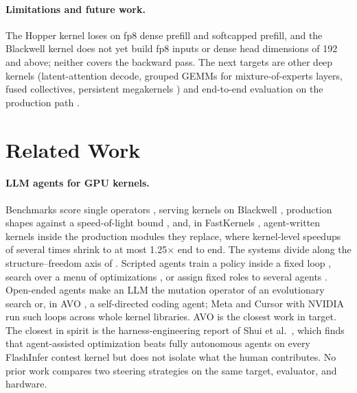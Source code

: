 \paragraph{Limitations and future work.} The Hopper kernel loses on fp8 dense prefill and
softcapped prefill, and the Blackwell kernel does not yet build fp8 inputs or dense head dimensions
of 192 and above; neither covers the backward pass. The next targets are other deep kernels (latent-attention decode, grouped GEMMs for
mixture-of-experts layers, fused collectives, persistent megakernels \cite{jin2026eventtensor}) and
end-to-end evaluation on the production path \cite{oliaro2026fastkernels}.

\section{Related Work}
\label{kernelseek:sec:related}

\paragraph{LLM agents for GPU kernels.} Benchmarks score single operators
\cite{kernelbench,zhang2026kernelbenchverified}, serving kernels on Blackwell
\cite{xing2026flashinferbench,cao2026ksearch}, production shapes against a speed-of-light bound
\cite{solexecbench}, and, in FastKernels \cite{oliaro2026fastkernels}, agent-written kernels
inside the production modules they replace, where kernel-level speedups of several times shrink to
at most 1.25$\times$ end to end. The systems divide along the structure--freedom axis of
. Scripted agents train a policy inside a fixed loop
\cite{baronio2025kevin,li2025cudal1,drkernel,zhu2026qimeng,cudaagent2026}, search over a
menu of optimizations \cite{hong2025autocomp,kernelpro2026}, or assign fixed roles to several agents
\cite{wei2025astra,kernelskill2026,han2026kda,luo2026houmao,sun2026kernelclaw}. Open-ended agents
make an LLM the mutation operator of an evolutionary search
\cite{romeraparedes2024funsearch,alphaevolve,lange2025shinkaevolve,guo2025evoengineer,wiedemann2026kernelfoundry,yuksekgonul2026tttdiscover,robustkbench,cuco2026}
or, in AVO \cite{chen2026avo}, a self-directed coding agent; Meta \cite{liao2025kernelevolve} and
Cursor with NVIDIA \cite{cursor2026multiagent} run such loops across whole kernel libraries. AVO is
the closest work in target. The closest in spirit is the harness-engineering report of Shui et al.\
\cite{shui2026harness}, which finds that agent-assisted optimization beats fully autonomous agents on
every FlashInfer contest kernel but does not isolate what the human contributes. No prior work
compares two steering strategies on the same target, evaluator, and hardware.

